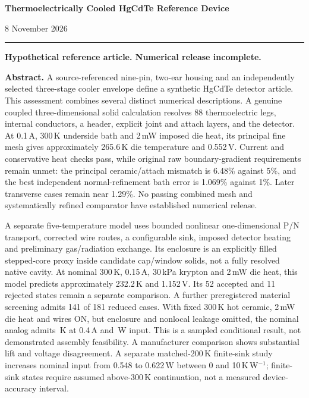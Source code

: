 \documentclass[11pt,a4paper]{article}
\begin{document}
\thispagestyle{empty}
{\Large\bfseries Thermoelectrically Cooled HgCdTe Reference Device\par}
\vspace{4mm}{\large Engineering Assessment\par}
\vspace{4mm}{\large\bfseries Revision 3\par}
8 November 2026
\vspace{3mm}\hrule\vspace{4mm}
\textcolor{failure}{\textbf{Hypothetical reference article. Numerical release incomplete.}}

\textbf{Abstract.} A source-referenced nine-pin, two-ear housing and an independently selected three-stage cooler envelope define a synthetic HgCdTe detector article. This assessment combines several distinct numerical descriptions. A genuine coupled three-dimensional solid calculation resolves 88 thermoelectric legs, internal conductors, a header, explicit joint and attach layers, and the detector. At 0.1\,A, 300\,K underside bath and 2\,mW imposed die heat, its principal fine mesh gives approximately 265.6\,K die temperature and 0.552\,V. Current and conservative heat checks pass, while original raw boundary-gradient requirements remain unmet: the principal ceramic/attach mismatch is 6.48\% against 5\%, and the best independent normal-refinement bath error is 1.069\% against 1\%. Later transverse cases remain near 1.29\%. No passing combined mesh and systematically refined comparator have established numerical release.

A separate five-temperature model uses bounded nonlinear one-dimensional P/N transport, corrected wire routes, a configurable sink, imposed detector heating and preliminary gas/radiation exchange. Its enclosure is an explicitly filled stepped-core proxy inside candidate cap/window solids, not a fully resolved native cavity. At nominal 300\,K, 0.15\,A, 30\,kPa krypton and 2\,mW die heat, this model predicts approximately 232.2\,K and 1.152\,V. Its 52 accepted and 11 rejected states remain a separate comparison. A further preregistered material screening admits 141 of 181 reduced cases. With fixed 300\,K hot ceramic, 2\,mW die heat and wires ON, but enclosure and nonlocal leakage omitted, the nominal analog admits \ScreenDie\,K at 0.4\,A and \ScreenPower\,W input. This is a sampled conditional result, not demonstrated assembly feasibility. A manufacturer comparison shows substantial lift and voltage disagreement. A separate matched-200\,K finite-sink study increases nominal input from 0.548 to 0.622\,W between 0 and 10\,K\,W$^{-1}$; finite-sink states require assumed above-300\,K continuation, not a measured device-accuracy interval.
\end{document}
